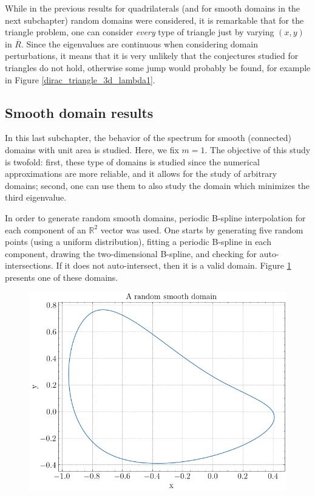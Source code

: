 While in the previous results for quadrilaterals (and for smooth domains in the next subchapter) random domains were considered, it is remarkable that for the triangle problem, one can consider \textit{every} type of triangle just by varying \((x,y)\) in \(\overline{R}\). Since the eigenvalues are continuous when considering domain perturbations, it means that it is very unlikely that the conjectures studied for triangles do not hold, otherwise some jump would probably be found, for example in Figure \ref{dirac_triangle_3d_lambda1}. 


\subsection{Smooth domain results}

In this last subchapter, the behavior of the spectrum for smooth (connected) domains with unit area is studied. Here, we fix \(m=1\). The objective of this study is twofold: first, these type of domains is studied since the numerical approximations are more reliable, and it allows for the study of arbitrary domains; second, one can use them to also study the domain which minimizes the third eigenvalue.

In order to generate random smooth domains, periodic B-spline interpolation for each component of an \(\mathbb{R}^2\) vector was used. One starts by generating five random points (using a uniform distribution), fitting a periodic B-spline in each component, drawing the two-dimensional B-spline, and checking for auto-intersections. If it does not auto-intersect, then it is a valid domain. Figure \ref{dirac_smooth_random_domain} presents one of these domains.

\begin{figure}[!htb]
    \centering
    \includegraphics[width=0.55\linewidth]{Images/Dirac/smooth/random_smooth_domain.png}
    \label{dirac_smooth_random_domain}
\end{figure}

